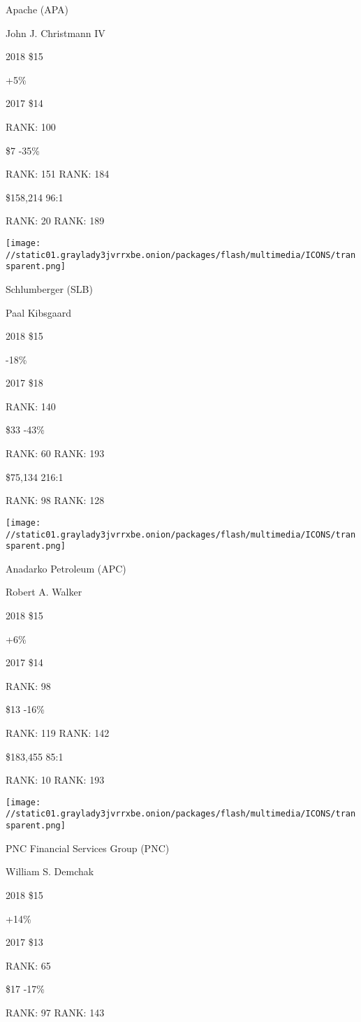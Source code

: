 Apache (APA)

John J. Christmann IV \protect\hyperlink{g-footnotes}{}

2018 \$15

 +5\%

2017 \$14

RANK: 100

 \$7 -35\%

RANK: 151 RANK: 184

 \$158,214 96:1

RANK: 20 RANK: 189

\texttt{[image: //static01.graylady3jvrrxbe.onion/packages/flash/multimedia/ICONS/transparent.png]}

Schlumberger (SLB)

Paal Kibsgaard \protect\hyperlink{g-footnotes}{}

2018 \$15

 -18\%

2017 \$18

RANK: 140

 \$33 -43\%

RANK: 60 RANK: 193

 \$75,134 216:1

RANK: 98 RANK: 128

\texttt{[image: //static01.graylady3jvrrxbe.onion/packages/flash/multimedia/ICONS/transparent.png]}

Anadarko Petroleum (APC)

Robert A. Walker \protect\hyperlink{g-footnotes}{}

2018 \$15

 +6\%

2017 \$14

RANK: 98

 \$13 -16\%

RANK: 119 RANK: 142

 \$183,455 85:1

RANK: 10 RANK: 193

\texttt{[image: //static01.graylady3jvrrxbe.onion/packages/flash/multimedia/ICONS/transparent.png]}

PNC Financial Services Group (PNC)

William S. Demchak \protect\hyperlink{g-footnotes}{}

2018 \$15

 +14\%

2017 \$13

RANK: 65

 \$17 -17\%

RANK: 97 RANK: 143

